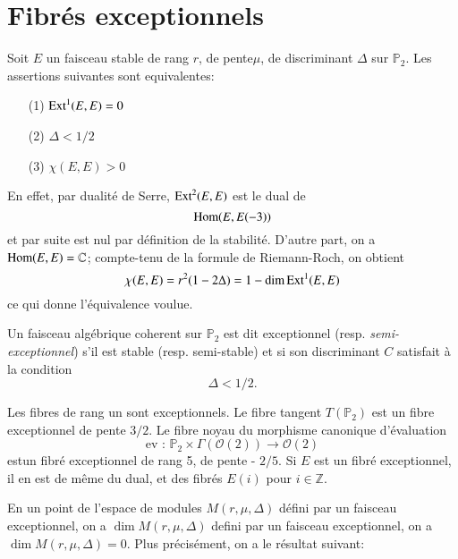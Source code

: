 \section{Fibr\'es exceptionnels}\label{chap5-sec4}

\begin{proposition}\label{chap5-prop1}
Soit $E$ un faisceau stable de rang $r$, de pente\pageoriginale $\mu$,
de discriminant $\Delta$ sur $\mathbb{P}_{2}$. Les assertions
suivantes sont equivalentes:
\begin{itemize}
\item[\rm(1)] $\operatorname{Ext}^{1}(E,E)=0$

\item[\rm(2)] $\Delta<1/2$

\item[\rm(3)] $\chi(E,E)>0$
\end{itemize}
\end{proposition}

En effet, par dualit\'e de Serre, $\operatorname{Ext}^{2}(E,E)$ est le dual de
$$
\operatorname{Hom}(E,E(-3))
$$ 
et par suite est nul par d\'efinition de la
stabilit\'e. D'autre part, on a $\operatorname{Hom}(E,E)=\mathbb{C}$; compte-tenu de
la formule de Riemann-Roch, on obtient
$$
\chi(E,E)=r^{2}(1-2\Delta)=1-\dim \operatorname{Ext}^{1}(E,E)
$$
ce qui donne l'\'equivalence voulue.

\begin{definition}\label{chap5-defi2}
Un faisceau alg\'ebrique coherent sur $\mathbb{P}_{2}$ est dit
exceptionnel (resp. {\em semi-exceptionnel}) s'il est stable
(resp. semi-stable) et si son discriminant $C$ satisfait \`a la
condition
$$
\Delta<1/2.
$$
\end{definition}

\begin{examples*}
Les fibres de rang un sont exceptionnels. Le fibre tangent
$T(\mathbb{P}_{2})$ est un fibre exceptionnel de pente $3/2$. Le fibre
noyau du morphisme canonique d'\'evaluation
$$
\text{ev~:~}\mathbb{P}_{2}\times \Gamma(\mathscr{O}(2))\to \mathscr{O}(2)
$$
est\pageoriginale un fibr\'e exceptionnel de rang 5, de pente -
$2/5$. Si $E$ est un fibr\'e exceptionnel, il en est de m\^eme du
dual, et des fibr\'es $E(i)$ pour $i\in \mathbb{Z}$.
\end{examples*}

En un point de l'espace de modules $M(r,\mu,\Delta)$ d\'efini par un
faisceau exceptionnel, on a $\dim M(r,\mu,\Delta)$ defini par un
faisceau exceptionnel, on a $\dim M(r,\mu,\Delta)=0$. Plus
pr\'ecis\'ement, on a le r\'esultat suivant:

